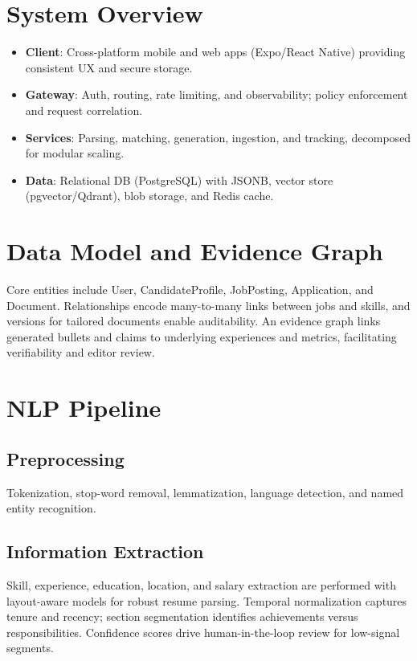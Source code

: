 \documentclass[12pt,a4paper]{report}
\begin{document}
\section{System Overview}
\begin{itemize}[leftmargin=2em]
  \item \textbf{Client}: Cross-platform mobile and web apps (Expo/React Native) providing consistent UX and secure storage.
  \item \textbf{Gateway}: Auth, routing, rate limiting, and observability; policy enforcement and request correlation.
  \item \textbf{Services}: Parsing, matching, generation, ingestion, and tracking, decomposed for modular scaling.
  \item \textbf{Data}: Relational DB (PostgreSQL) with JSONB, vector store (pgvector/Qdrant), blob storage, and Redis cache.
\end{itemize}

\section{Data Model and Evidence Graph}
Core entities include User, CandidateProfile, JobPosting, Application, and Document. Relationships encode many-to-many links between jobs and skills, and versions for tailored documents enable auditability. An evidence graph links generated bullets and claims to underlying experiences and metrics, facilitating verifiability and editor review.

\section{NLP Pipeline}
\subsection{Preprocessing}
Tokenization, stop-word removal, lemmatization, language detection, and named entity recognition.

\subsection{Information Extraction}
Skill, experience, education, location, and salary extraction are performed with layout-aware models for robust resume parsing. Temporal normalization captures tenure and recency; section segmentation identifies achievements versus responsibilities. Confidence scores drive human-in-the-loop review for low-signal segments.
\end{document}
